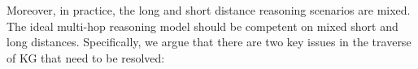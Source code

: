 Moreover, in practice, the long and short distance reasoning scenarios are mixed.
The ideal multi-hop reasoning model should be competent on mixed short and long distances.
Specifically, we argue that there are two key issues in the traverse of KG that need to be resolved:

